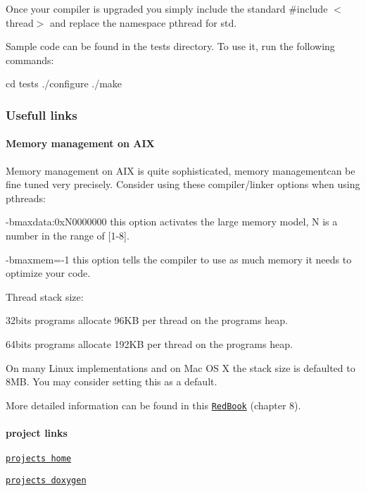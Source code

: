 Once your compiler is upgraded you simply include the standard {\ttfamily \#include $<$thread$>$} and replace the namespace {\ttfamily pthread} for {\ttfamily std}.

Sample code can be found in the {\ttfamily tests} directory. To use it, run the following commands\+:

cd tests ./configure ./make

\subsubsection*{Usefull links}

\paragraph*{Memory management on A\+IX}

Memory management on A\+IX is quite sophisticated, memory managementcan be fine tuned very precisely. Consider using these compiler/linker options when using pthreads\+:
\begin{DoxyItemize}
\item -\/bmaxdata\+:0x\+N0000000 this option activates the large memory model, N is a number in the range of \mbox{[}1-\/8\mbox{]}.
\item -\/bmaxmem=-\/1 this option tells the compiler to use as much memory it needs to optimize your code.
\end{DoxyItemize}

Thread stack size\+:
\begin{DoxyItemize}
\item 32bits programs allocate 96\+KB per thread on the program\textquotesingle{}s heap.
\item 64bits programs allocate 192\+KB per thread on the program\textquotesingle{}s heap.
\end{DoxyItemize}

On many Linux implementations and on Mac OS X the stack size is defaulted to 8\+MB. You may consider setting this as a default.

More detailed information can be found in this \href{http://www.redbooks.ibm.com/redbooks/pdfs/sg245674.pdf}{\tt Red\+Book} (chapter 8).

\paragraph*{project links}


\begin{DoxyItemize}
\item \href{https://github.com/HerbertKoelman/cpp-pthread}{\tt project\textquotesingle{}s home}
\item \href{http://herbertkoelman.github.io/cpp-pthread/doc/html/}{\tt project\textquotesingle{}s doxygen}
\end{DoxyItemize}

